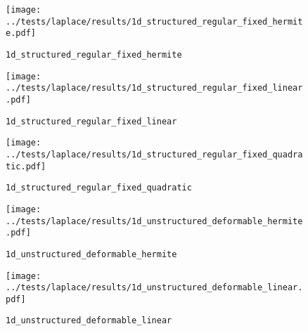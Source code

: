 

%

\begin{figure}[h!]
  \centering%
  \texttt{[image: ../tests/laplace/results/1d\_structured\_regular\_fixed\_hermite.pdf]}
  \caption{\lstinline{1d_structured_regular_fixed_hermite}}
\end{figure} 




%

\begin{figure}[h!]
  \centering%
  \texttt{[image: ../tests/laplace/results/1d\_structured\_regular\_fixed\_linear.pdf]}
  \caption{\lstinline{1d_structured_regular_fixed_linear}}
\end{figure} 




%

\begin{figure}[h!]
  \centering%
  \texttt{[image: ../tests/laplace/results/1d\_structured\_regular\_fixed\_quadratic.pdf]}
  \caption{\lstinline{1d_structured_regular_fixed_quadratic}}
\end{figure} 




%

\begin{figure}[h!]
  \centering%
  \texttt{[image: ../tests/laplace/results/1d\_unstructured\_deformable\_hermite.pdf]}
  \caption{\lstinline{1d_unstructured_deformable_hermite}}
\end{figure} 




%

\begin{figure}[h!]
  \centering%
  \texttt{[image: ../tests/laplace/results/1d\_unstructured\_deformable\_linear.pdf]}
  \caption{\lstinline{1d_unstructured_deformable_linear}}
\end{figure} 


